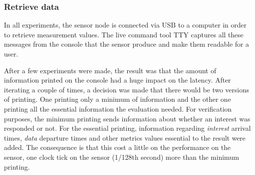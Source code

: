 \subsubsection{Retrieve data}
In all experiments, the sensor node is connected via USB to a computer in order to retrieve measurement values. The live command tool TTY captures all these messages from the console that the sensor produce and make them readable for a user. 

After a few experiments were made, the result was that the amount of information printed on the console had a huge impact on the latency.
After iterating a couple of times, a decision was made that there would be two versions of printing. One printing only a minimum of information and the other one printing all the essential information the evaluation needed. For verification purposes, the minimum printing sends information about whether an interest was responded or not. 
For the essential printing, information regarding \textit{interest} arrival times, \textit{data} departure times and other metrics values essential to the result were added. The consequence is that this cost a little on the performance on the sensor, one clock tick on the sensor (1/128th second) more than the minimum printing. 
